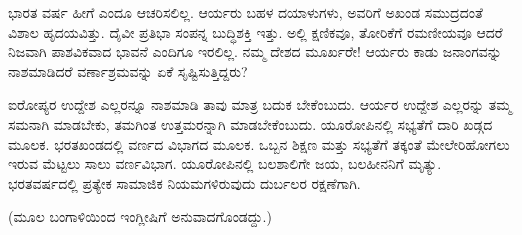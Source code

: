 ಭಾರತ ವರ್ಷ ಹೀಗೆ ಎಂದೂ ಆಚರಿಸಲಿಲ್ಲ. ಆರ್ಯರು ಬಹಳ ದಯಾಳುಗಳು, ಅವರಿಗೆ ಅಖಂಡ ಸಮುದ್ರದಂತೆ ವಿಶಾಲ ಹೃದಯವಿತ್ತು. ದೈವೀ ಪ್ರತಿಭಾ ಸಂಪನ್ನ ಬುದ್ಧಿಶಕ್ತಿ ಇತ್ತು. ಅಲ್ಲಿ ಕ್ಷಣಿಕವೂ, ತೋರಿಕೆಗೆ ರಮಣೀಯವೂ ಆದರೆ ನಿಜವಾಗಿ ಪಾಶವಿಕ\break ವಾದ ಭಾವನೆ ಎಂದಿಗೂ ಇರಲಿಲ್ಲ. ನಮ್ಮ ದೇಶದ ಮೂರ್ಖರೇ! ಆರ್ಯರು ಕಾಡು ಜನಾಂಗವನ್ನು ನಾಶಮಾಡಿದರೆ ವರ್ಣಾಶ್ರಮವನ್ನು ಏಕೆ ಸೃಷ್ಟಿಸುತ್ತಿದ್ದರು?

\vskip 5pt

ಐರೋಪ್ಯರ ಉದ್ದೇಶ ಎಲ್ಲರನ್ನೂ ನಾಶಮಾಡಿ ತಾವು ಮಾತ್ರ ಬದುಕ ಬೇಕೆಂಬುದು. ಆರ್ಯರ ಉದ್ದೇಶ ಎಲ್ಲರನ್ನು ತಮ್ಮ ಸಮನಾಗಿ ಮಾಡಬೇಕು, ತಮಗಿಂತ ಉತ್ತಮರನ್ನಾಗಿ ಮಾಡಬೇಕೆಂಬುದು. ಯೂರೋಪಿನಲ್ಲಿ ಸಭ್ಯತೆಗೆ ದಾರಿ ಖಡ್ಗದ ಮೂಲಕ. ಭರತಖಂಡದಲ್ಲಿ ವರ್ಣದ ವಿಭಾಗದ ಮೂಲಕ. ಒಬ್ಬನ ಶಿಕ್ಷಣ ಮತ್ತು ಸಭ್ಯತೆಗೆ ತಕ್ಕಂತೆ ಮೇಲೇರಿಹೋಗಲು ಇರುವ ಮೆಟ್ಟಲು ಸಾಲು ವರ್ಣವಿಭಾಗ. ಯೂರೋಪಿನಲ್ಲಿ ಬಲ\break ಶಾಲಿಗೇ ಜಯ, ಬಲಹೀನನಿಗೆ ಮೃತ್ಯು. ಭರತವರ್ಷದಲ್ಲಿ ಪ್ರತ್ಯೇಕ ಸಾಮಾಜಿಕ ನಿಯಮ\break ಗಳಿರುವುದು ದುರ್ಬಲರ ರಕ್ಷಣೆಗಾಗಿ.

\begin{center}
(ಮೂಲ ಬಂಗಾಳಿಯಿಂದ ಇಂಗ್ಲೀಷಿಗೆ ಅನುವಾದಗೊಂಡದ್ದು.)
\end{center}

